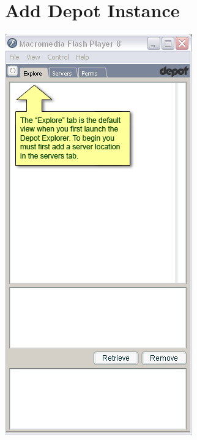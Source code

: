 \documentclass{report}
\begin{document}
\section{Add Depot Instance}
\begin{center}
\includegraphics[scale=0.5]{users-images/Step1-annotated.png}

\end{center}
\end{document}
